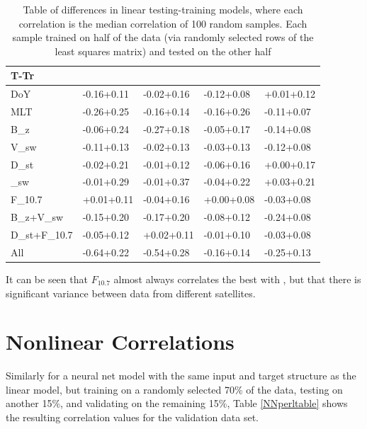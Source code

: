  \begin{table}[h]
 	\small
 	\begin{tabular}{|L|LLLL|}
 		\hline
 		T-Tr &  &  &  & \\ \hline
 		DoY & -0.16\pm+0.11 & -0.02\pm+0.16 & -0.12\pm+0.08 & +0.01\pm+0.12 \\
 		MLT & -0.26\pm+0.25 & -0.16\pm+0.14 & -0.16\pm+0.26 & -0.11\pm+0.07 \\
 		B_z & -0.06\pm+0.24 & -0.27\pm+0.18 & -0.05\pm+0.17 & -0.14\pm+0.08 \\
 		V_{sw} & -0.11\pm+0.13 & -0.02\pm+0.13 & -0.03\pm+0.13 & -0.12\pm+0.08 \\
 		D_{st} & -0.02\pm+0.21 & -0.01\pm+0.12 & -0.06\pm+0.16 & +0.00\pm+0.17 \\
 		\rho_{sw} & -0.01\pm+0.29 & -0.01\pm+0.37 & -0.04\pm+0.22 & +0.03\pm+0.21 \\
 		F_{10.7} & +0.01\pm+0.11 & -0.04\pm+0.16 & +0.00\pm+0.08 & -0.03\pm+0.08 \\
 		B_z+V_{sw} & -0.15\pm+0.20 & -0.17\pm+0.20 & -0.08\pm+0.12 & -0.24\pm+0.08 \\
 		D_{st}+F_{10.7} & -0.05\pm+0.12 & +0.02\pm+0.11 & -0.01\pm+0.10 & -0.03\pm+0.08 \\
 		All & -0.64\pm+0.22 & -0.54\pm+0.28 & -0.16\pm+0.14 & -0.25\pm+0.13 \\
 		\hline
 	\end{tabular}
 	\caption{Table of differences in linear testing-training models, where each correlation is the median correlation of 100 random samples. Each sample trained on half of the data (via randomly selected rows of the least squares matrix) and tested on the other half} 
 	\label{CCdifftable}
 \end{table}




It can be seen that $F_{10.7}$ almost always correlates the best with \req, but that there is significant variance between data from different satellites. 

\section{Nonlinear Correlations}

Similarly for a neural net model with the same input and target structure as the linear model, but training on a randomly selected 70\% of the data, testing on another 15\%, and validating on the remaining 15\%, Table \ref{NNperltable} shows the resulting correlation values for the validation data set.

